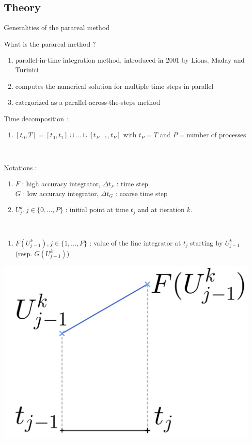 \subsection{Theory}

\begin{frame}[allowframebreaks]{Generalities of the parareal method}
	
	\small
	What is the parareal method ?
	\begin{enumerate}[\textbullet]
		\item parallel-in-time integration method, introduced in 2001 by Lions, Maday and Turinici
		\item computes the numerical solution for multiple time steps in parallel
		\item categorized as a parallel-across-the-steps method 
	\end{enumerate}

	\newpage

	Time decomposition :
	\begin{enumerate}[\textbullet]
		\item $[t_0,T]=[t_0,t_1]\cup\dots\cup[t_{P-1},t_P]$ with $t_P=T$ and $P=$number of processes
	\end{enumerate}

	\; \\

	\begin{minipage}{\linewidth}
		Notations :
		\begin{enumerate}[\textbullet]
			\item $F$ : high accuracy integrator, \quad $\Delta t_F$ : time step \\
			$G$ : low accuracy integrator, \quad $\Delta t_G$ : coarse time step
			\item $U_j^k, j\in\{0,\dots,P\}$ : initial point at time $t_j$ and at iteration $k$.
		\end{enumerate}
	\end{minipage} \\
	\begin{enumerate}[\textbullet]
		\item $F(U_{j-1}^k), j\in\{1,\dots,P\}$ : value of the fine integrator at $t_j$ starting by $U_{j-1}^k$ (resp. $G(U_{j-1}^k)$)
	\end{enumerate}
	\begin{minipage}{\linewidth}
		\centering
		\qquad \includegraphics[width=0.35\linewidth]{images/parareal/explane_F.jpg}
	\end{minipage}
	
\end{frame}

